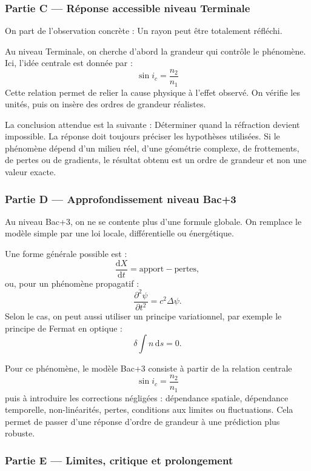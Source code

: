 \documentclass[11pt,a4paper]{article}
\begin{document}
\subsubsection*{Partie C — Réponse accessible niveau Terminale}

\begin{corrigebox}
On part de l'observation concrète : Un rayon peut être totalement réfléchi.

Au niveau Terminale, on cherche d'abord la grandeur qui contrôle le phénomène. Ici, l'idée centrale est donnée par :
\[
\sin i_c=\frac{n_2}{n_1}
\]
Cette relation permet de relier la cause physique à l'effet observé. On vérifie les unités, puis on insère des ordres de grandeur réalistes.

La conclusion attendue est la suivante : Déterminer quand la réfraction devient impossible. La réponse doit toujours préciser les hypothèses utilisées. Si le phénomène dépend d'un milieu réel, d'une géométrie complexe, de frottements, de pertes ou de gradients, le résultat obtenu est un ordre de grandeur et non une valeur exacte.
\end{corrigebox}

\subsubsection*{Partie D — Approfondissement niveau Bac+3}

\begin{approfondissementbox}
Au niveau Bac+3, on ne se contente plus d'une formule globale. On remplace le modèle simple par une loi locale, différentielle ou énergétique.

Une forme générale possible est :
\[
\frac{\mathrm d X}{\mathrm dt}=\text{apport}-\text{pertes},
\]
ou, pour un phénomène propagatif :
\[
\frac{\partial^2 \psi}{\partial t^2}=c^2\Delta\psi.
\]
Selon le cas, on peut aussi utiliser un principe variationnel, par exemple le principe de Fermat en optique :
\[
\delta \int n\,\mathrm ds=0.
\]

Pour ce phénomène, le modèle Bac+3 consiste à partir de la relation centrale
\[
\sin i_c=\frac{n_2}{n_1}
\]
puis à introduire les corrections négligées : dépendance spatiale, dépendance temporelle, non-linéarités, pertes, conditions aux limites ou fluctuations. Cela permet de passer d'une réponse d'ordre de grandeur à une prédiction plus robuste.
\end{approfondissementbox}

\subsubsection*{Partie E — Limites, critique et prolongement}
\end{document}
